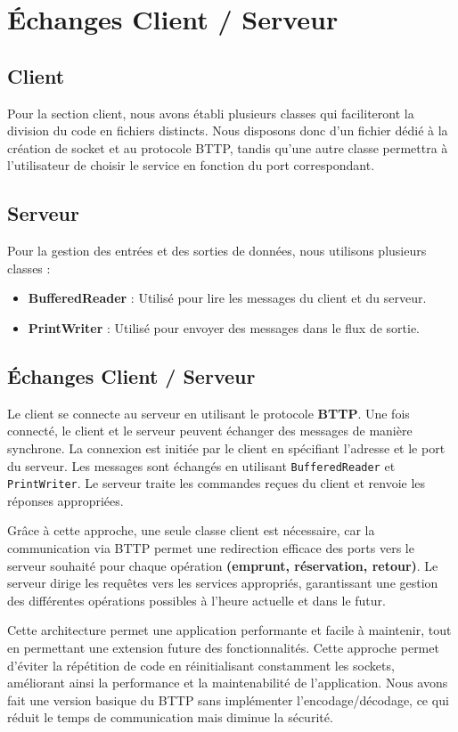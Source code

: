\chapter{Échanges Client / Serveur}


\section{Client}

Pour la section client, nous avons établi plusieurs classes qui faciliteront la division du code en fichiers distincts.
Nous disposons donc d'un fichier dédié à la création de socket et au protocole BTTP, tandis qu'une autre classe permettra à l'utilisateur de choisir le service en fonction du port correspondant.


\section{Serveur}

Pour la gestion des entrées et des sorties de données, nous utilisons plusieurs classes :

\begin{itemize}
    \item \textbf{BufferedReader} : Utilisé pour lire les messages du client et du serveur.
    \item \textbf{PrintWriter} : Utilisé pour envoyer des messages dans le flux de sortie.
\end{itemize}


\section{Échanges Client / Serveur}

Le client se connecte au serveur en utilisant le protocole \textbf{BTTP}. Une fois connecté, le client et le serveur peuvent échanger des messages de manière synchrone. La connexion est initiée par le client en spécifiant l'adresse et le port du serveur. Les messages sont échangés en utilisant \texttt{BufferedReader} et \texttt{PrintWriter}. Le serveur traite les commandes reçues du client et renvoie les réponses appropriées.

Grâce à cette approche, une seule classe client est nécessaire, car la communication via BTTP permet une redirection efficace des ports vers le serveur souhaité pour chaque opération \textbf{(emprunt, réservation, retour)}. Le serveur dirige les requêtes vers les services appropriés, garantissant une gestion des différentes opérations possibles à l’heure actuelle et dans le futur.

Cette architecture permet une application performante et facile à maintenir, tout en permettant une extension future des fonctionnalités. Cette approche permet d'éviter la répétition de code en réinitialisant constamment les sockets, améliorant ainsi la performance et la maintenabilité de l'application. Nous avons fait une version basique du BTTP sans implémenter l’encodage/décodage, ce qui réduit le temps de communication mais diminue la sécurité.
